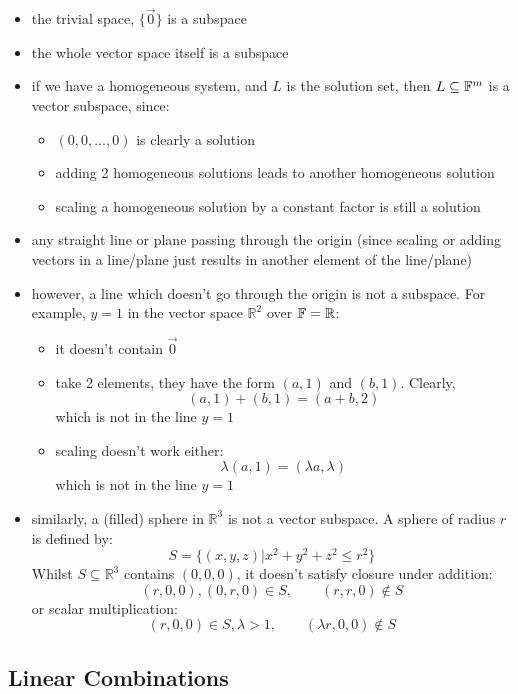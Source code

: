 \documentclass{exam}
\begin{document}
\begin{itemize}
    \item the trivial space, $\{\vec{0}\}$ is a subspace
    \item the whole vector space itself is a subspace
    \item if we have a homogeneous system, and $L$ is the solution set, then $L \subseteq \mathbb{F}^m$ is a vector subspace, since:
    \begin{itemize}
        \item $(0,0,\ldots,0)$ is clearly a solution
        \item adding 2 homogeneous solutions leads to another homogeneous solution
        \item scaling a homogeneous solution by a constant factor is still a solution
    \end{itemize}
    \item any straight line or plane passing through the origin (since scaling or adding vectors in a line/plane just results in another element of the line/plane)
    \item however, a line which doesn't go through the origin is not a subspace. For example, $y = 1$ in the vector space $\mathbb{R}^2$ over $\mathbb{F} = \mathbb{R}$:
    \begin{itemize}
        \item it doesn't contain $\vec{0}$
        \item take 2 elements, they have the form $(a,1)$ and $(b,1)$. Clearly,
        \[
        (a,1) + (b,1) = (a+b, 2)
        \]
        which is not in the line $y = 1$
        \item scaling doesn't work either:
        \[
        \lambda(a,1) = (\lambda a, \lambda)
        \]
        which is not in the line $y = 1$
    \end{itemize}
    \item similarly, a (filled) sphere in $\mathbb{R}^3$ is not a vector subspace. A sphere of radius $r$ is defined by:
    \[
    S = \{(x,y,z) | x^2 + y^2 + z^2 \leq r^2\}
    \]
    Whilst $S \subseteq \mathbb{R}^3$ contains $(0,0,0)$, it doesn't satisfy closure under addition:
    \[
    (r,0,0), (0,r,0) \in S, \qquad (r,r,0) \not\in S
    \]
    or scalar multiplication:
    \[
    (r,0,0) \in S, \lambda > 1, \qquad (\lambda r, 0, 0) \not\in S
    \]
\end{itemize}

\subsection{Linear Combinations}
\end{document}
